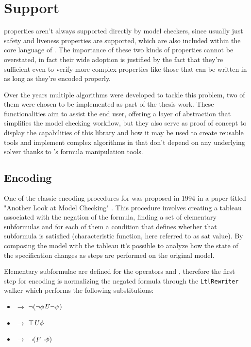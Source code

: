\chapter{\ltl{} Support}
\label{ch:ltl-support}
\ltl{} properties aren't always supported directly by model checkers, since usually just safety and liveness properties are supported, which are also included within the core language of \vmtlib{}.
The importance of these two kinds of properties cannot be overstated, in fact their wide adoption is justified by the fact that they're sufficient even to verify more complex properties like those that can be written in \LTL{} as long as they're encoded properly.

Over the years multiple algorithms were developed to tackle this problem, two of them were chosen to be implemented as part of the thesis work.
These functionalities aim to assist the end user, offering a layer of abstraction that simplifies the model checking workflow, but they also serve as proof of concept to display the capabilities of this library and how it may be used to create reusable tools and implement complex algorithms in \python{} that don't depend on any underlying solver thanks to \pysmt{}'s formula manipulation tools.

\section{\ltltosmv{} Encoding}
One of the classic encoding procedures for \ltl{} was proposed in 1994 in a paper titled "Another Look at \ltl{} Model Checking" \cite{DBLP:conf/cav/ClarkeGH94}.
This procedure involves creating a tableau associated with the negation of the \ltl{} formula, finding a set of elementary subformulas and for each of them a condition that defines whether that subformula is satisfied (characteristic function, here referred to as sat value).
By composing the model with the tableau it's possible to analyze how the state of the \ltl{} specification changes as steps are performed on the original model.

Elementary subformulae are defined for the \ltl{} operators \fX{} and \fU{}, therefore the first step for encoding is normalizing the negated formula through the \texttt{LtlRewriter} walker which performs the following substitutions:
\begin{itemize}
    \item \fR{} $\longrightarrow{}$ $\lnot(\lnot \phi \mathit{U} \lnot \psi)$
    \item \fF{} $\longrightarrow{}$ $\top \mathit{U} \phi$
    \item \fG{} $\longrightarrow{}$ $\lnot (\mathit{F} \lnot \phi)$
\end{itemize}

